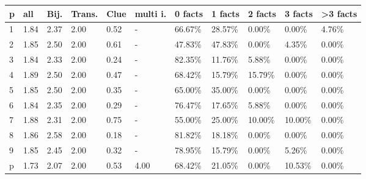 \begin{tabular}{lllllllllll}
\toprule
 p &   all &  Bij. & Trans. &  Clue & multi i. & 0 facts & 1 facts & 2 facts & 3 facts & >3 facts \\
\midrule
 1 &  1.84 &  2.37 &   2.00 &  0.52 &        - &  66.67\% &  28.57\% &   0.00\% &   0.00\% &    4.76\% \\
 2 &  1.85 &  2.50 &   2.00 &  0.61 &        - &  47.83\% &  47.83\% &   0.00\% &   4.35\% &    0.00\% \\
 3 &  1.84 &  2.33 &   2.00 &  0.24 &        - &  82.35\% &  11.76\% &   5.88\% &   0.00\% &    0.00\% \\
 4 &  1.89 &  2.50 &   2.00 &  0.47 &        - &  68.42\% &  15.79\% &  15.79\% &   0.00\% &    0.00\% \\
 5 &  1.85 &  2.50 &   2.00 &  0.35 &        - &  65.00\% &  35.00\% &   0.00\% &   0.00\% &    0.00\% \\
 6 &  1.84 &  2.35 &   2.00 &  0.29 &        - &  76.47\% &  17.65\% &   5.88\% &   0.00\% &    0.00\% \\
 7 &  1.88 &  2.31 &   2.00 &  0.75 &        - &  55.00\% &  25.00\% &  10.00\% &  10.00\% &    0.00\% \\
 8 &  1.86 &  2.58 &   2.00 &  0.18 &        - &  81.82\% &  18.18\% &   0.00\% &   0.00\% &    0.00\% \\
 9 &  1.85 &  2.45 &   2.00 &  0.32 &        - &  78.95\% &  15.79\% &   0.00\% &   5.26\% &    0.00\% \\
 p &  1.73 &  2.07 &   2.00 &  0.53 &     4.00 &  68.42\% &  21.05\% &   0.00\% &  10.53\% &    0.00\% \\
\bottomrule
\end{tabular}
